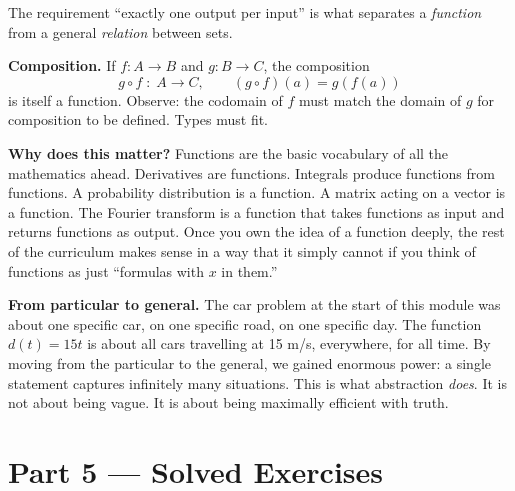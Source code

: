 \documentclass[12pt, a4paper]{article}
\newcounter{problem}
\begin{document}
\begin{namebox}
\begin{center}
\end{center}


The requirement ``exactly one output per input'' is what separates a \emph{function} from a general \emph{relation} between sets.

\medskip
\textbf{Composition.} If $f : A \to B$ and $g : B \to C$, the composition
\[
  g \circ f \;:\; A \to C, \qquad (g \circ f)(a) = g(f(a))
\]
is itself a function. Observe: the codomain of $f$ must match the domain of $g$ for composition to be defined. Types must fit.
\end{namebox}

\medskip
\noindent\textbf{Why does this matter?}
Functions are the basic vocabulary of all the mathematics ahead. Derivatives are functions. Integrals produce functions from functions. A probability distribution is a function. A matrix acting on a vector is a function. The Fourier transform is a function that takes functions as input and returns functions as output. Once you own the idea of a function deeply, the rest of the curriculum makes sense in a way that it simply cannot if you think of functions as just ``formulas with $x$ in them.''

\begin{thought}
\textbf{From particular to general.}
The car problem at the start of this module was about one specific car, on one specific road, on one specific day. The function $d(t) = 15t$ is about all cars travelling at 15 m/s, everywhere, for all time. By moving from the particular to the general, we gained enormous power: a single statement captures infinitely many situations. This is what abstraction \emph{does}. It is not about being vague. It is about being maximally efficient with truth.
\end{thought}

\section{Part 5 \texorpdfstring{---}{--} Solved Exercises}
\end{document}
